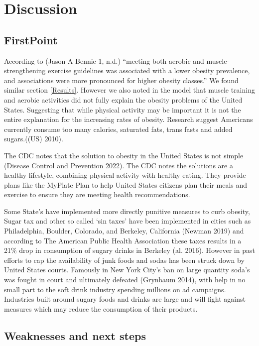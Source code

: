 \documentclass[
]{article}
\begin{document}
\hypertarget{Discussion}{%
\section{Discussion}\label{Discussion}}

\hypertarget{FirstPoint}{%
\subsection{FirstPoint}\label{FirstPoint}}

According to (Jason A Bennie 1, n.d.) ``meeting both aerobic and muscle-strengthening exercise guidelines was associated with a lower obesity prevalence, and associations were more pronounced for higher obesity classes.'' We found similar section \ref{Results}. However we also noted in the model that muscle training and aerobic activities did not fully explain the obesity problems of the United States. Suggesting that while physical activity may be important it is not the entire explanation for the increasing rates of obesity. Research suggest Americans currently consume too many calories, saturated fats, trans fasts and added sugars.((US) 2010).

The CDC notes that the solution to obesity in the United States is not simple (Disease Control and Prevention 2022). The CDC notes the solutions are a healthy lifestyle, combining physical activity with healthy eating. They provide plans like the MyPlate Plan to help United States citizens plan their meals and exercise to ensure they are meeting health recommendations.

Some State's have implemented more directly punitive measures to curb obesity, Sugar tax and other so called `sin taxes' have been implemented in cities such as Philadelphia, Boulder, Colorado, and Berkeley, California (Newman 2019) and according to The American Public Health Association these taxes results in a 21\% drop in consumption of sugary drinks in Berkeley (al. 2016). However in past efforts to cap the availability of junk foods and sodas has been struck down by United States courts. Famously in New York City's ban on large quantity soda's was fought in court and ultimately defeated (Grynbaum 2014), with help in no small part to the soft drink industry spending millions on ad campaigns. Industries built around sugary foods and drinks are large and will fight against measures which may reduce the consumption of their products.

\hypertarget{weaknesses-and-next-steps}{%
\subsection{Weaknesses and next steps}\label{weaknesses-and-next-steps}}
\end{document}
